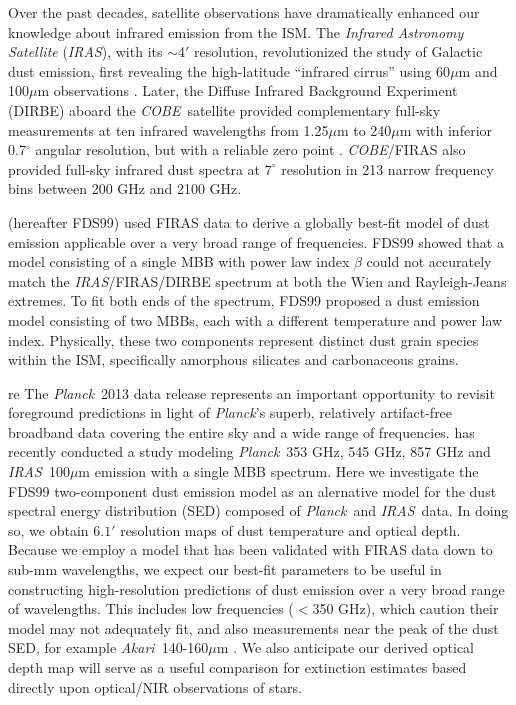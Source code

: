 \documentclass{emulateapj}
\newcommand{\IRAS}{{\it IRAS}}
\newcommand{\PLANCK}{{\it Planck}}
\newcommand{\AKARI}{{\it Akari}}
\newcommand{\COBE}{{\it COBE}}
\begin{document}
Over the past decades, satellite observations have dramatically enhanced our
knowledge about infrared emission from the ISM. The \textit{Infrared Astronomy 
Satellite} (\IRAS), with its $\sim$4$'$ resolution, revolutionized the study of
 Galactic dust emission, first revealing the high-latitude ``infrared cirrus'' 
using 60$\mu$m and 100$\mu$m observations \citep{low84, wheelock94}. Later, the
Diffuse Infrared Background Experiment (DIRBE) aboard the \COBE~satellite 
provided complementary full-sky measurements at ten infrared wavelengths from 
1.25$\mu$m to 240$\mu$m with inferior 0.7$^{\circ}$ angular resolution, but 
with a reliable zero point \citep{boggess92}. \COBE/FIRAS \citep{firas} also 
provided full-sky infrared dust spectra at $7^{\circ}$ resolution in 213 narrow
frequency bins between 200 GHz and 2100 GHz.

\cite{FDS99} (hereafter FDS99) used FIRAS data to derive a globally best-fit 
model of dust emission applicable over a very broad range of frequencies. 
FDS99 showed that a model consisting of a single MBB with power law index 
$\beta$ could not accurately match the \IRAS/FIRAS/DIRBE spectrum at both the 
Wien and Rayleigh-Jeans extremes. To fit both ends of the spectrum, FDS99 
proposed a dust emission model consisting of two MBBs, each with a different
temperature and power law index. Physically, these two components
represent distinct dust grain species within the ISM, specifically 
amorphous silicates and carbonaceous grains.

re
The \PLANCK~2013 data release \citep{planck2013} represents an important 
opportunity to revisit foreground predictions in light of \PLANCK's superb, 
relatively artifact-free broadband data covering the entire sky and a wide 
range of frequencies. \cite{planckdust} has recently conducted a study modeling
\PLANCK~353 GHz, 545 GHz, 857 GHz and \IRAS~100$\mu$m emission with a single
MBB spectrum. Here we investigate the FDS99 two-component dust emission model 
as an alernative model for the dust spectral energy distribution (SED) composed
 of \PLANCK~and \IRAS~data. In doing so, we obtain $6.1'$ resolution maps of 
dust temperature and optical depth. Because we employ a model that has been 
validated with FIRAS data down to sub-mm wavelengths, we expect our best-fit 
parameters to be useful in constructing high-resolution predictions of dust 
emission over a very broad range of wavelengths. This includes low frequencies 
($<$350 GHz), which \cite{planckdust} caution their model may not adequately 
fit, and also measurements near the peak of the dust SED, for example 
\AKARI~140-160$\mu$m \citep{akari}. We also anticipate our derived optical 
depth map will serve as a useful comparison for extinction estimates based 
directly upon optical/NIR observations of stars.
\end{document}
